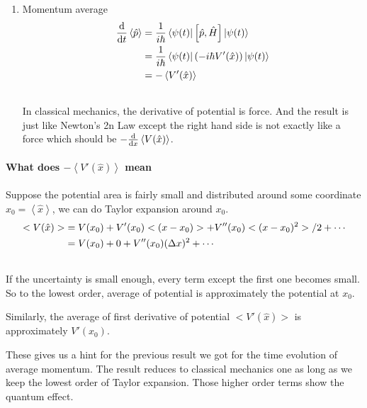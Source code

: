 \documentclass[letterpaper,10pt,english]{sphinxmanual}
\def\d{{\rm d}}
\newcommand{\bra}[1]{\left\langle #1\right|}
\newcommand{\ket}[1]{\left| #1\right\rangle}
\begin{document}
\begin{enumerate}
\item {} 
Momentum average
\begin{gather}
\begin{split}\frac{\d}{\d t} \left<\hat p\right> & =  \frac{1}{i\hbar} \bra{\psi(t)} \left[\hat p, \hat H\right] \ket{\psi(t)} \\
& =  \frac{1}{i\hbar} \bra{\psi(t)}  (-i\hbar V'(\hat x))  \ket{\psi(t)}  \\
& =  -\left< V'(\hat x) \right>\end{split}\notag\\\begin{split}\end{split}\notag
\end{gather}
In classical mechanics, the derivative of potential is force. And the result is just like Newton's 2n Law except the right hand side is not exactly like a force which should be $-\frac{\d}{\d x} \left< V(\hat x) \right>$.

\end{enumerate}


\paragraph{What does $-\left< V'(\hat x)\right>$ mean}
\label{QuantumMechanics:what-does-mean}
Suppose the potential area is fairly small and distributed around some coordinate $x_0=\left< \hat x \right>$, we can do Taylor expansion around $x_0$.
\begin{gather}
\begin{split}< V(\hat x)> & =  V(x_0)   +  V'(x_0) < (x - x_0)> + V''(x_0)<(x-x_0)^2> /2 + \cdots \\
& =  V(x_0) + 0 + V''(x_0) (\Delta x)^2 + \cdots\end{split}\notag\\\begin{split}\end{split}\notag
\end{gather}
If the uncertainty is small enough, every term except the first one becomes small. So to the lowest order, average of potential is approximately the potential at $x_0$.

Similarly, the average of first derivative of potential $<V'(\hat x)>$ is approximately $V'(x_0)$.

These gives us a hint for the previous result we got for the time evolution of average momentum. The result reduces to classical mechanics one as long as we keep the lowest order of Taylor expansion. Those higher order terms show the quantum effect.
\end{document}
